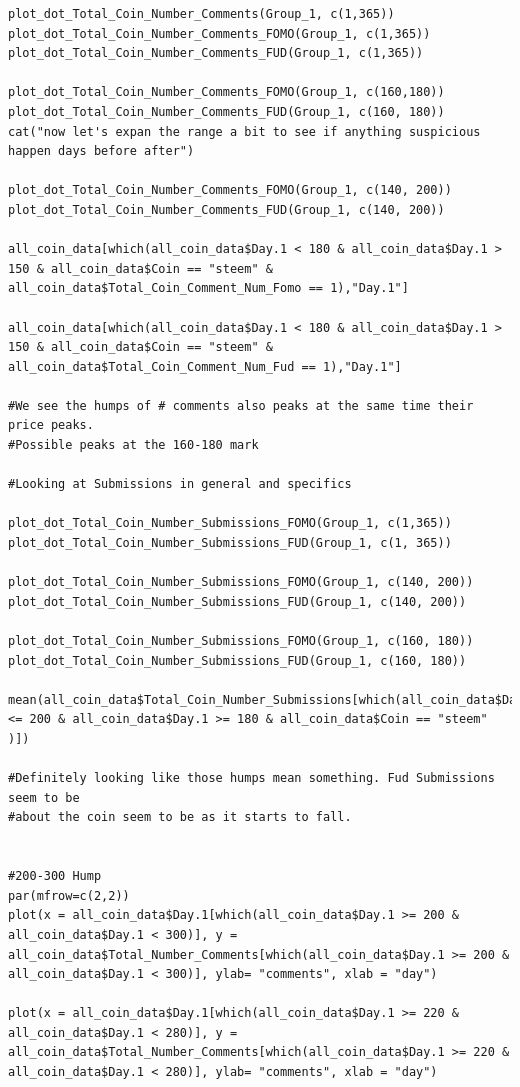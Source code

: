 \documentclass[12pt]{article}
\begin{document}
{\begin{verbatim}
plot_dot_Total_Coin_Number_Comments(Group_1, c(1,365))
plot_dot_Total_Coin_Number_Comments_FOMO(Group_1, c(1,365))
plot_dot_Total_Coin_Number_Comments_FUD(Group_1, c(1,365))

plot_dot_Total_Coin_Number_Comments_FOMO(Group_1, c(160,180))
plot_dot_Total_Coin_Number_Comments_FUD(Group_1, c(160, 180))
cat("now let's expan the range a bit to see if anything suspicious happen days before after")

plot_dot_Total_Coin_Number_Comments_FOMO(Group_1, c(140, 200))
plot_dot_Total_Coin_Number_Comments_FUD(Group_1, c(140, 200))

all_coin_data[which(all_coin_data$Day.1 < 180 & all_coin_data$Day.1 > 150 & all_coin_data$Coin == "steem" & all_coin_data$Total_Coin_Comment_Num_Fomo == 1),"Day.1"]

all_coin_data[which(all_coin_data$Day.1 < 180 & all_coin_data$Day.1 > 150 & all_coin_data$Coin == "steem" & all_coin_data$Total_Coin_Comment_Num_Fud == 1),"Day.1"]

#We see the humps of # comments also peaks at the same time their price peaks. 
#Possible peaks at the 160-180 mark

#Looking at Submissions in general and specifics

plot_dot_Total_Coin_Number_Submissions_FOMO(Group_1, c(1,365))
plot_dot_Total_Coin_Number_Submissions_FUD(Group_1, c(1, 365))

plot_dot_Total_Coin_Number_Submissions_FOMO(Group_1, c(140, 200))
plot_dot_Total_Coin_Number_Submissions_FUD(Group_1, c(140, 200))

plot_dot_Total_Coin_Number_Submissions_FOMO(Group_1, c(160, 180))
plot_dot_Total_Coin_Number_Submissions_FUD(Group_1, c(160, 180))

mean(all_coin_data$Total_Coin_Number_Submissions[which(all_coin_data$Day.1 <= 200 & all_coin_data$Day.1 >= 180 & all_coin_data$Coin == "steem" )])

#Definitely looking like those humps mean something. Fud Submissions seem to be 
#about the coin seem to be as it starts to fall.


#200-300 Hump
par(mfrow=c(2,2))
plot(x = all_coin_data$Day.1[which(all_coin_data$Day.1 >= 200 & all_coin_data$Day.1 < 300)], y = all_coin_data$Total_Number_Comments[which(all_coin_data$Day.1 >= 200 & all_coin_data$Day.1 < 300)], ylab= "comments", xlab = "day")

plot(x = all_coin_data$Day.1[which(all_coin_data$Day.1 >= 220 & all_coin_data$Day.1 < 280)], y = all_coin_data$Total_Number_Comments[which(all_coin_data$Day.1 >= 220 & all_coin_data$Day.1 < 280)], ylab= "comments", xlab = "day")


\end{verbatim}}
\end{document}
